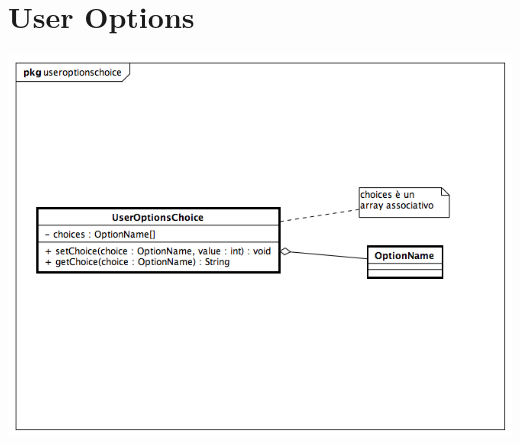 \documentclass[a4paper, 12pt]{report}
\begin{document}
\section{User Options}
\includegraphics[width=\textwidth]{chart/UserOptionsChoice.png}
\end{document}
